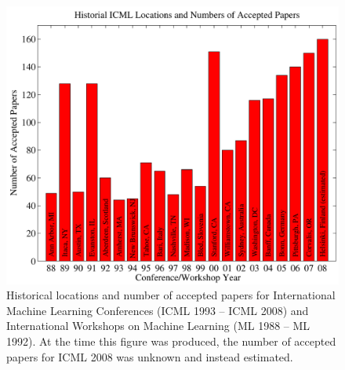 \documentclass{article}
\begin{document}
\begin{figure}[tb]
\vskip 5mm
\begin{center}
\centerline{\includegraphics[width=\columnwidth]{icml_numpapers}}
\caption{Historical locations and number of accepted papers for International
  Machine Learning Conferences (ICML 1993 -- ICML 2008) and
  International Workshops on Machine Learning (ML 1988 -- ML
  1992). At the time this figure was produced, the number of
  accepted papers for ICML 2008 was unknown and instead estimated.}
\label{fig:sample-graph}
\end{center}
\vskip -5mm
\end{figure} 
\end{document}
